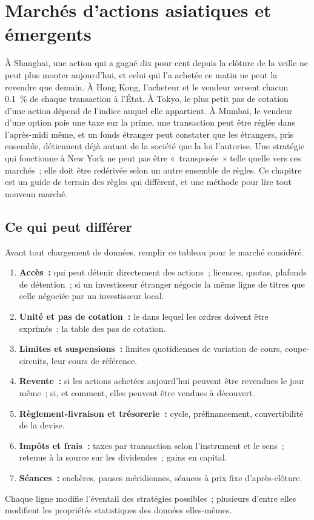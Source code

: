 \chapter{Marchés d'actions asiatiques et émergents}\label{ch:m1:asian-and-emerging-equity-markets}

À Shanghai, une action qui a gagné dix pour cent depuis la clôture de la veille
ne peut plus monter aujourd'hui, et celui qui l'a achetée ce matin ne peut la revendre
que demain. À Hong Kong, l'acheteur et le vendeur versent chacun 0.1~\% de chaque transaction à l'État.
À Tokyo, le plus petit pas de cotation d'une action
dépend de l'indice auquel elle appartient. À Mumbai, le vendeur d'une option paie
une taxe sur la prime, une transaction peut être réglée dans l'après-midi même, et un
fonds étranger peut constater que les étrangers, pris ensemble, détiennent déjà autant
de la société que la loi l'autorise. Une stratégie qui fonctionne à New York ne peut pas
être «~transposée~» telle quelle vers ces marchés~; elle doit être redérivée selon un autre
ensemble de règles. Ce chapitre est un guide de terrain des règles qui diffèrent, et une méthode
pour lire tout nouveau marché.

\section{Ce qui peut différer}

\begin{method}\label{met:m1:asian-and-emerging-equity-markets:checklist}
Avant tout chargement de données, remplir ce tableau pour le marché considéré.
\begin{enumerate}
\item \textbf{Accès~:} qui peut détenir directement des actions~; licences, quotas,
  plafonds de détention~; si un investisseur étranger négocie la même ligne de titres
  que celle négociée par un investisseur local.
\item \textbf{Unité et pas de cotation~:} le  dans lequel les ordres doivent être exprimés~; la
  table des pas de cotation.
\item \textbf{Limites et suspensions~:} limites quotidiennes de variation de cours, coupe-circuits, leur
  cours de référence.
\item \textbf{Revente~:} si les actions achetées aujourd'hui peuvent être revendues le jour même~;
  si, et comment, elles peuvent être vendues à découvert.
\item \textbf{Règlement-livraison et trésorerie~:} cycle, préfinancement, convertibilité
  de la devise.
\item \textbf{Impôts et frais~:} taxes par transaction selon l'instrument et le sens~;
  retenue à la source sur les dividendes~; gains en capital.
\item \textbf{Séances~:} enchères, pauses méridiennes, séances à prix fixe
  d'après-clôture.
\end{enumerate}
Chaque ligne modifie l'éventail des stratégies possibles~; plusieurs d'entre elles modifient
les propriétés statistiques des données elles-mêmes.
\end{method}

